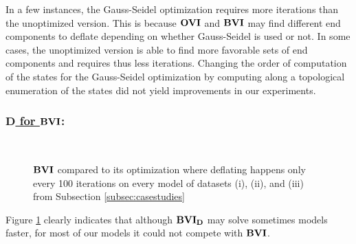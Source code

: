 In a few instances, the Gauss-Seidel optimization requires more iterations than the unoptimized version. 
This is because $\mathbf{OVI}$ and $\mathbf{BVI}$ may find different end components to deflate depending on whether Gauss-Seidel is used or not.
In some cases, the unoptimized version is able to find more favorable sets of end components and requires thus less iterations.
Changing the order of computation of the states for the Gauss-Seidel optimization by computing along a topological enumeration of the states did not
yield improvements in our experiments.  

\subsubsection*{\underline{$\mathbf{D}$ for $\mathbf{BVI}$}:}
\begin{figure}[h!]
    \centering
    \
    \caption{$\mathbf{BVI}$ compared to its optimization where deflating happens only every 100 iterations on every model of datasets (i), (ii), and (iii) from Subsection \ref{subsec:casestudies}}%
    \label{fig:Scatter_D}%
    \end{figure}
\FloatBarrier
Figure \ref{fig:Scatter_D} clearly indicates that although $\mathbf{BVI_D}$ may solve sometimes models faster, 
for most of our models it could not compete with $\mathbf{BVI}$.

